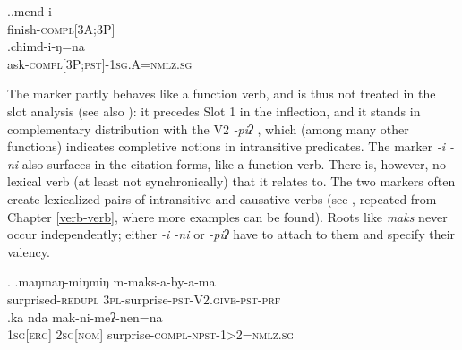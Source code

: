  \ex.\ag.mend-i\\
 finish{\scshape -compl[3A;3P]}\\
 \bg.chimd-i-ŋ=na\\
ask{\scshape -compl[3P;pst]-1sg.A=nmlz.sg}\\
 
The marker partly behaves like a function verb, and is thus not treated in the slot analysis (see also ): it precedes Slot 1 in the inflection, and it stands in complementary distribution with the V2 \emph{-piʔ} , which (among many other functions) indicates completive notions in intransitive  predicates. The marker \emph{-i \ti -ni} also surfaces in the citation forms, like a function verb. There is, however, no lexical verb (at least not synchronically) that it relates to. The two markers often create lexicalized pairs of intransitive and causative verbs (see \Next, repeated from Chapter \ref{verb-verb}, where more examples can be found). Roots like \emph{maks}  never occur independently; either \emph{-i \ti -ni} or \emph{-piʔ} have to attach to them and specify their valency. 

 
\ex. \ag.maŋmaŋ-miŋmiŋ m-maks-a-by-a-ma\\
	surprised{\scshape -redupl} {\scshape 3pl-}surprise{\scshape -pst-V2.give-pst-prf}\\
	 
 	\bg.ka nda mak-ni-meʔ-nen=na\\
	{\scshape 1sg[erg]} {\scshape 2sg[nom]} surprise{\scshape -compl-npst-1>2=nmlz.sg}		\\
	

 
 
 
 
